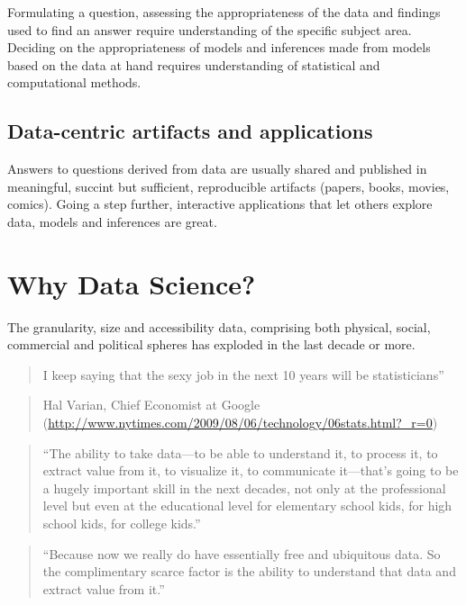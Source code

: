 \documentclass[12pt,]{book}
\theoremstyle{definition}
\theoremstyle{definition}
\theoremstyle{definition}
\theoremstyle{remark}
\begin{document}
Formulating a question, assessing the appropriateness of the data and
findings used to find an answer require understanding of the specific
subject area. Deciding on the appropriateness of models and inferences
made from models based on the data at hand requires understanding of
statistical and computational methods.

\subsection{Data-centric artifacts and
applications}\label{data-centric-artifacts-and-applications}

Answers to questions derived from data are usually shared and published
in meaningful, succint but sufficient, reproducible artifacts (papers,
books, movies, comics). Going a step further, interactive applications
that let others explore data, models and inferences are great.

\section{Why Data Science?}\label{why-data-science}

The granularity, size and accessibility data, comprising both physical,
social, commercial and political spheres has exploded in the last decade
or more.

\begin{quote}
I keep saying that the sexy job in the next 10 years will be
statisticians''
\end{quote}

\begin{quote}
Hal Varian, Chief Economist at Google
(\url{http://www.nytimes.com/2009/08/06/technology/06stats.html?_r=0})
\end{quote}

\begin{quote}
``The ability to take data---to be able to understand it, to process it,
to extract value from it, to visualize it, to communicate it---that's
going to be a hugely important skill in the next decades, not only at
the professional level but even at the educational level for elementary
school kids, for high school kids, for college kids.''
\end{quote}

\begin{quote}
``Because now we really do have essentially free and ubiquitous data. So
the complimentary scarce factor is the ability to understand that data
and extract value from it.''
\end{quote}
\end{document}
